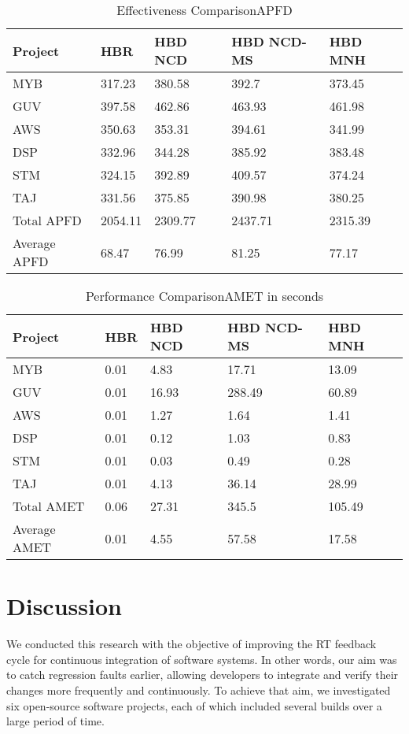 \documentclass[1p]{elsarticle}
\begin{document}
\begin{table}[H]
\centering
\caption {Effectiveness Comparison\textemdash APFD}
\label{table:rq3_apfd}
\begin{tabular}{|l|l|l|l|l|}
\hline                       
 Project & HBR & HBD NCD & HBD NCD-MS & HBD MNH \\
\hline  
\hline
	MYB& 317.23&380.58&392.7&373.45\\
	\hline
	GUV& 397.58&462.86&463.93&461.98\\
	\hline
	AWS& 350.63&353.31&394.61&341.99\\
	\hline
	DSP& 332.96&344.28&385.92&383.48\\
	\hline
	STM& 324.15&392.89&409.57&374.24\\
	\hline
	TAJ& 331.56&375.85&390.98&380.25\\
	\hline
	Total APFD& 2054.11&2309.77&2437.71&2315.39\\
	\hline
	Average APFD& 68.47&76.99&81.25&77.17\\
	\hline
\end{tabular}
\end{table}


\begin{table}[H]
\centering
\caption {Performance Comparison\textemdash AMET in seconds}
\label{table:rq3_time}
\begin{tabular}{|l|l|l|l|l|}
\hline                       
 Project & HBR & HBD NCD & HBD NCD-MS & HBD MNH \\
\hline  
\hline
	MYB&0.01&4.83&17.71&13.09\\
	\hline
	GUV&0.01&16.93&288.49&60.89\\
	\hline
	AWS&0.01&1.27&1.64&1.41\\
	\hline
	DSP&0.01&0.12&1.03&0.83\\
	\hline
	STM&0.01&0.03&0.49&0.28\\
	\hline
	TAJ&0.01&4.13&36.14&28.99\\
	\hline
	Total AMET&0.06&27.31&345.5&105.49\\
	\hline
	Average AMET&0.01&4.55&57.58&17.58\\
\hline
\end{tabular}
\end{table}



\section{Discussion}
We conducted this research with the objective of improving the RT feedback cycle for continuous integration of software systems. In other words, our aim was to catch regression faults earlier, allowing developers to integrate and verify their changes more frequently and continuously. To achieve that aim, we investigated six open-source software projects, each of which included several builds over a large period of time.
\end{document}
